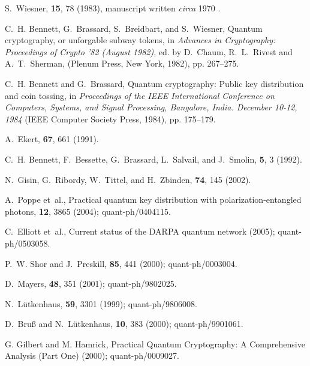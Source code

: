 \documentclass{ws-ijqi}
\begin{document}
\begin{thebibliography}{10}

S.~Wiesner,
 {\bf 15}, 78 (1983),
\newblock manuscript written {\it circa} 1970 \cite[Ref.~27]{benn-92}.

C.~H. Bennett, G.~Brassard, S.~Breidbart, and S.~Wiesner,
\newblock Quantum cryptography, or unforgable subway tokens,
\newblock in {\em Advances in Cryptography: Proceedings of Crypto '82 (August 1982)},
\newblock ed. by D.~Chaum, R.~L.~Rivest and A.~T.~Sherman,
(Plenum Press, New York, 1982),  pp. 267--275.

C.~H. Bennett and G.~Brassard,
\newblock Quantum cryptography: Public key distribution and coin tossing,
\newblock in {\em Proceedings of the IEEE International Conference on
  Computers, Systems, and Signal Processing, Bangalore, India. {D}ecember 10-12, 1984}
  (IEEE Computer Society Press, 1984), pp. 175--179.

A.~Ekert,
 {\bf 67}, 661 (1991).

C.~H. Bennett, F.~Bessette, G.~Brassard, L.~Salvail, and J.~Smolin,
 {\bf 5}, 3 (1992).

N.~Gisin, G.~Ribordy, W.~Tittel, and H.~Zbinden,
 {\bf 74}, 145 (2002).

A.~Poppe et~al.,
\newblock Practical quantum key distribution with polarization-entangled
  photons,
 {\bf 12}, 3865 (2004);
\newblock quant-ph/0404115.

C.~Elliott et~al.,
\newblock Current status of the {DARPA} quantum network (2005);
\newblock quant-ph/0503058.

P.~W. Shor and J.~Preskill,
 {\bf 85}, 441 (2000);
\newblock quant-ph/0003004.

D.~Mayers,
 {\bf 48}, 351 (2001);
\newblock quant-ph/9802025.

N.~L\"utkenhaus,
 {\bf 59}, 3301 (1999);
\newblock quant-ph/9806008.

D.~Bru{\ss} and N.~L\"utkenhaus,
 {\bf 10}, 383 (2000);
\newblock quant-ph/9901061.

G. Gilbert and M. Hamrick,
\newblock Practical Quantum Cryptography: A Comprehensive Analysis (Part One) (2000);
\newblock quant-ph/0009027.


\end{thebibliography}
\end{document}
